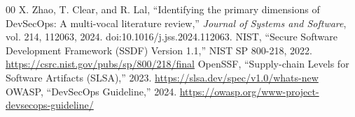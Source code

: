 \documentclass[conference]{IEEEtran}
\begin{document}
\begin{thebibliography}{00}
 X. Zhao, T. Clear, and R. Lal, ``Identifying the primary dimensions of DevSecOps: A multi-vocal literature review,'' \emph{Journal of Systems and Software}, vol. 214, 112063, 2024. doi:10.1016/j.jss.2024.112063.
 NIST, ``Secure Software Development Framework (SSDF) Version 1.1,'' NIST SP 800-218, 2022. \url{https://csrc.nist.gov/pubs/sp/800/218/final}
 OpenSSF, ``Supply-chain Levels for Software Artifacts (SLSA),'' 2023. \url{https://slsa.dev/spec/v1.0/whats-new}
 OWASP, ``DevSecOps Guideline,'' 2024. \url{https://owasp.org/www-project-devsecops-guideline/}
\end{thebibliography}
\end{document}
